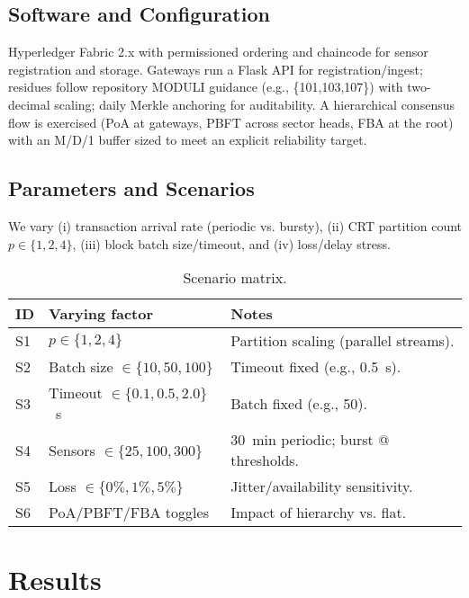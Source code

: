 \subsection{Software and Configuration}
Hyperledger Fabric 2.x with permissioned ordering and chaincode for sensor registration and storage. Gateways run a Flask API for registration/ingest; residues follow repository MODULI guidance (e.g., \{101,103,107\}) with two-decimal scaling; daily Merkle anchoring for auditability. A hierarchical consensus flow is exercised (PoA at gateways, PBFT across sector heads, FBA at the root) with an M/D/1 buffer sized to meet an explicit reliability target.\ %

\subsection{Parameters and Scenarios}
We vary (i) transaction arrival rate (periodic vs. bursty), (ii) CRT partition count $p\in\{1,2,4\}$, (iii) block batch size/timeout, and (iv) loss/delay stress.
\begin{table}[!t]
  \centering
  \caption{Scenario matrix.}
  \label{tab:scenarios}
  \begin{tabular}{lll}
    \toprule
    ID & Varying factor & Notes \\
    \midrule
    S1 & $p\in\{1,2,4\}$ & Partition scaling (parallel streams). \\
    S2 & Batch size $\in\{10,50,100\}$ & Timeout fixed (e.g., 0.5~s). \\
    S3 & Timeout $\in\{0.1,0.5,2.0\}$~s & Batch fixed (e.g., 50). \\
    S4 & Sensors $\in\{25,100,300\}$ & 30~min periodic; burst @ thresholds. \\
    S5 & Loss $\in\{0\%,1\%,5\%\}$ & Jitter/availability sensitivity. \\
    S6 & PoA/PBFT/FBA toggles & Impact of hierarchy vs. flat. \\
    \bottomrule
  \end{tabular}
\end{table}

\section{Results}

